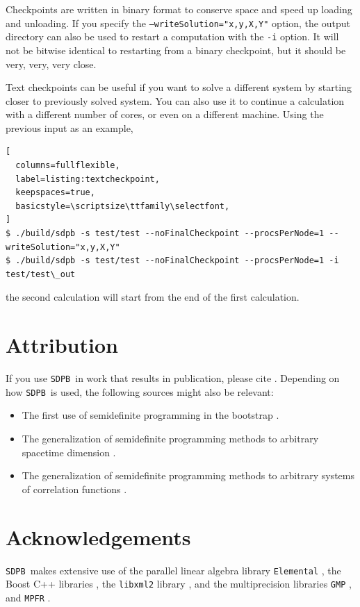 \documentclass[12pt]{article}
\numberwithin{equation}{section}
\newcommand\SDPB{\texttt{SDPB}}
\begin{document}
Checkpoints are written in binary format to conserve space and speed
up loading and unloading.  If you specify the \texttt{--writeSolution="x,y,X,Y"}
option, the output directory can also be used to restart a computation
with the \texttt{-i} option.  It will not be bitwise identical to
restarting from a binary checkpoint, but it should be very, very, very
close.

Text checkpoints can be useful if you want to solve a different system
by starting closer to previously solved system.  You can also use it
to continue a calculation with a different number of cores, or even on
a different machine.  Using the previous input as an example,

\begin{lstlisting}[
  columns=fullflexible,
  label=listing:textcheckpoint,
  keepspaces=true,
  basicstyle=\scriptsize\ttfamily\selectfont,
]
$ ./build/sdpb -s test/test --noFinalCheckpoint --procsPerNode=1 --writeSolution="x,y,X,Y"
$ ./build/sdpb -s test/test --noFinalCheckpoint --procsPerNode=1 -i test/test\_out
\end{lstlisting}
the second calculation will start from the end of the first calculation.

\section{Attribution}

If you use \SDPB\ in work that results in publication, please cite \cite{DSD}. Depending on how \SDPB\ is used, the following sources might also be relevant:
\begin{itemize}
\item The first use of semidefinite programming in the bootstrap \cite{Poland:2011ey}.
\item The generalization of semidefinite programming methods to arbitrary
spacetime dimension \cite{Kos:2013tga}.
\item The generalization of semidefinite programming methods to arbitrary
systems of correlation functions \cite{Kos:2014bka}.
\end{itemize}

\section{Acknowledgements}

\SDPB\ makes extensive use of the parallel linear algebra library
\texttt{Elemental} \cite{Elemental}, the Boost C++
libraries \cite{BoostSite}, the \texttt{libxml2} library
\cite{libxml2}, and the multiprecision libraries \texttt{GMP}
\cite{GMP}, and \texttt{MPFR}
\cite{MPFR}.
\end{document}
